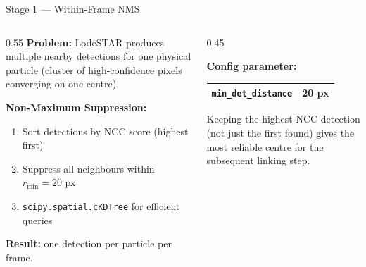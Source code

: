 \begin{frame}{Stage 1 — Within-Frame NMS}
\begin{columns}
\begin{column}{0.55\textwidth}
\textbf{Problem:} LodeSTAR produces multiple nearby detections for one physical particle (cluster of high-confidence pixels converging on one centre).

\smallskip
\textbf{Non-Maximum Suppression:}
\begin{enumerate}\small
    \item Sort detections by NCC score (highest first)
    \item Suppress all neighbours within $r_{\min} = 20$ px
    \item \texttt{scipy.spatial.cKDTree} for efficient queries
\end{enumerate}
\smallskip
\textbf{Result:} one detection per particle per frame.
\end{column}
\begin{column}{0.45\textwidth}
\begin{center}
\small\textbf{Config parameter:}\\[0.2cm]
\begin{tabular}{|l|c|}
\hline
\texttt{min\_det\_distance} & 20 px \\
\hline
\end{tabular}
\end{center}
\smallskip
\begin{mynote}
\small Keeping the highest-NCC detection (not just the first found) gives the most reliable centre for the subsequent linking step.
\end{mynote}
\end{column}
\end{columns}
\end{frame}

